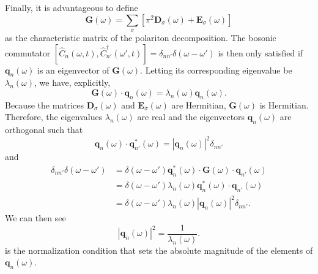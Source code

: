 Finally, it is advantageous to define
\begin{equation}
\mathbf{G}(\omega) = \sum_\sigma\left[\pi^2\mathbf{D}_\sigma(\omega) + \mathbf{E}_\sigma(\omega)\right]
\end{equation}
as the characteristic matrix of the polariton decomposition. The bosonic commutator $[\hat{C}_n(\omega,t),\hat{C}_{n'}^\dagger(\omega',t)] = \delta_{nn'}\delta(\omega - \omega')$ is then only satisfied if $\mathbf{q}_n(\omega)$ is an eigenvector of $\mathbf{G}(\omega)$. Letting its corresponding eigenvalue be $\lambda_n(\omega)$, we have, explicitly,
\begin{equation}
\mathbf{G}(\omega)\cdot\mathbf{q}_n(\omega) = \lambda_n(\omega)\mathbf{q}_n(\omega).
\end{equation}
Because the matrices $\mathbf{D}_\sigma(\omega)$ and $\mathbf{E}_\sigma(\omega)$ are Hermitian, $\mathbf{G}(\omega)$ is Hermitian.  Therefore, the eigenvalues $\lambda_n(\omega)$ are real and the eigenvectors $\mathbf{q}_n(\omega)$ are orthogonal such that
\begin{equation}
\mathbf{q}_n(\omega)\cdot\mathbf{q}_{n'}^*(\omega) = |\mathbf{q}_n(\omega)|^2\delta_{nn'}
\end{equation}
and
\begin{equation}
\begin{split}
\delta_{nn'}\delta(\omega - \omega') &= \delta(\omega - \omega')\mathbf{q}_n^*(\omega)\cdot\mathbf{G}(\omega)\cdot\mathbf{q}_{n'}(\omega)\\
&= \delta(\omega - \omega')\lambda_n(\omega)\mathbf{q}_n^*(\omega)\cdot\mathbf{q}_{n'}(\omega)\\
&= \delta(\omega - \omega')\lambda_n(\omega)|\mathbf{q}_n(\omega)|^2\delta_{nn'}.
\end{split}
\end{equation}
We can then see
\begin{equation}
|\mathbf{q}_n(\omega)|^2 = \frac{1}{\lambda_n(\omega)}.
\end{equation}
is the normalization condition that sets the absolute magnitude of the elements of $\mathbf{q}_n(\omega)$. 

